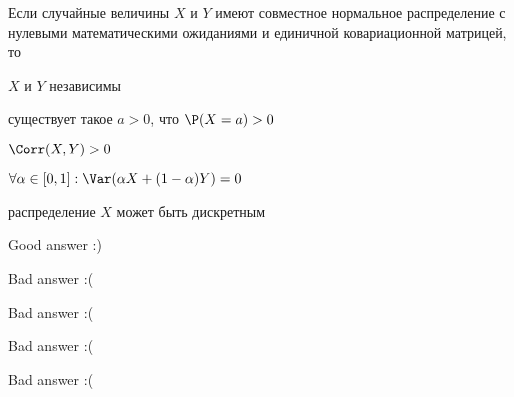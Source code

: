 
\begin{question}
Если случайные величины \(X\) и \(Y\) имеют совместное нормальное
распределение с нулевыми математическими ожиданиями и единичной
ковариационной матрицей, то
\begin{answerlist}
  \item \(X\) и \(Y\) независимы
  \item существует такое \(a>0\), что \(\P(X=a)>0\)
  \item \(\Corr(X,Y)>0\)
  \item \(\forall \alpha \in [0,1]: \Var(\alpha X + (1-\alpha)Y) = 0\)
  \item распределение \(X\) может быть дискретным
\end{answerlist}
\end{question}

\begin{solution}
\begin{answerlist}
  \item Good answer :)
  \item Bad answer :(
  \item Bad answer :(
  \item Bad answer :(
  \item Bad answer :(
\end{answerlist}
\end{solution}


